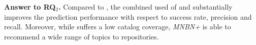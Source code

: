 


\begin{tcolorbox}[boxrule=0.86pt,left=0.3em, right=0.3em,top=0.1em, bottom=0.05em]
\textbf{Answer to RQ$_2$.} Compared to \MNB, the combined used of \MNB and \TFb 
substantially improves the prediction performance with respect to success rate, 
precision and recall. Moreover, while \MNB suffers a low catalog coverage, 
\textit{MNBN+\TF} 
is able to recommend a wide range of topics to repositories.
\end{tcolorbox}










